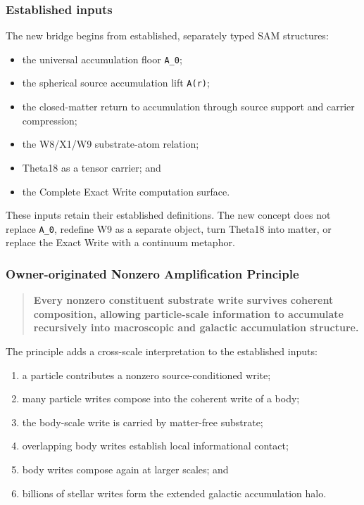 \subsubsection{Established inputs}\label{viii-ch12-established-inputs}

The new bridge begins from established, separately typed SAM structures:

\begin{itemize}
\tightlist
\item
  the universal accumulation floor \texttt{A\_0};
\item
  the spherical source accumulation lift \texttt{A(r)};
\item
  the closed-matter return to accumulation through source support and
  carrier compression;
\item
  the W8/X1/W9 substrate-atom relation;
\item
  Theta18 as a tensor carrier; and
\item
  the Complete Exact Write computation surface.
\end{itemize}

These inputs retain their established definitions. The new concept does
not replace \texttt{A\_0}, redefine W9 as a separate object, turn
Theta18 into matter, or replace the Exact Write with a continuum
metaphor.

\subsubsection{Owner-originated Nonzero Amplification
Principle}\label{viii-ch12-owner-originated-nonzero-amplification-principle}

\begin{quote}
\textbf{Every nonzero constituent substrate write survives coherent
composition, allowing particle-scale information to accumulate
recursively into macroscopic and galactic accumulation structure.}
\end{quote}

The principle adds a cross-scale interpretation to the established
inputs:

\begin{enumerate}
\def\labelenumi{\arabic{enumi}.}
\tightlist
\item
  a particle contributes a nonzero source-conditioned write;
\item
  many particle writes compose into the coherent write of a body;
\item
  the body-scale write is carried by matter-free substrate;
\item
  overlapping body writes establish local informational contact;
\item
  body writes compose again at larger scales; and
\item
  billions of stellar writes form the extended galactic accumulation
  halo.
\end{enumerate}


